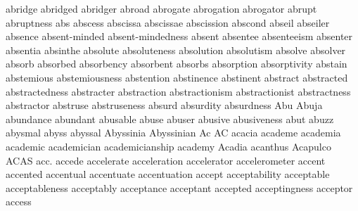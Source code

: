 abridge abridged abridger abroad abrogate abrogation abrogator abrupt abruptness abs abscess abscissa abscissae abscission abscond abseil abseiler absence absent-minded absent-mindedness absent absentee absenteeism absenter absentia absinthe absolute absoluteness absolution absolutism absolve absolver absorb absorbed absorbency absorbent absorbs absorption absorptivity abstain abstemious abstemiousness abstention abstinence abstinent abstract abstracted abstractedness abstracter abstraction abstractionism abstractionist abstractness abstractor abstruse abstruseness absurd absurdity absurdness Abu Abuja abundance abundant abusable abuse abuser abusive abusiveness abut abuzz abysmal abyss abyssal Abyssinia Abyssinian Ac AC acacia academe academia academic academician academicianship academy Acadia acanthus Acapulco ACAS acc. accede accelerate acceleration accelerator accelerometer accent accented accentual accentuate accentuation accept acceptability acceptable acceptableness acceptably acceptance acceptant accepted acceptingness acceptor access 